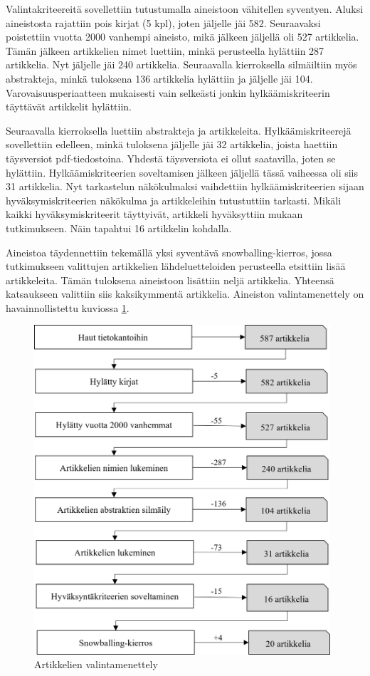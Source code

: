 \documentclass[utf8]{gradu3}
\begin{document}
Valintakriteereitä sovellettiin tutustumalla aineistoon vähitellen syventyen. Aluksi  aineistosta rajattiin pois kirjat (5 kpl), joten jäljelle jäi 582. Seuraavaksi poistettiin vuotta 2000 vanhempi aineisto, mikä jälkeen jäljellä oli 527 artikkelia. Tämän jälkeen artikkelien nimet luettiin, minkä perusteella hylättiin 287 artikkelia. Nyt jäljelle jäi 240 artikkelia. Seuraavalla kierroksella silmäiltiin myös abstrakteja, minkä tuloksena 136 artikkelia hylättiin ja jäljelle jäi 104. Varovaisuusperiaatteen mukaisesti vain selkeästi jonkin hylkäämiskriteerin täyttävät artikkelit hylättiin.

Seuraavalla kierroksella luettiin abstrakteja ja artikkeleita. Hylkäämiskriteerejä sovellettiin edelleen, minkä tuloksena jäljelle jäi 32 artikkelia, joista haettiin täysversiot pdf-tiedostoina. Yhdestä täysversiota ei ollut saatavilla, joten se hylättiin. Hylkäämiskriteerien soveltamisen jälkeen jäljellä tässä vaiheessa oli siis 31 artikkelia. Nyt tarkastelun näkökulmaksi vaihdettiin hylkäämiskriteerien sijaan hyväksymiskriteerien näkökulma ja artikkeleihin tutustuttiin tarkasti. Mikäli kaikki hyväksymiskriteerit täyttyivät, artikkeli hyväksyttiin mukaan tutkimukseen. Näin tapahtui 16 artikkelin kohdalla.

Aineistoa täydennettiin tekemällä yksi syventävä snowballing-kierros, jossa tutkimukseen valittujen artikkelien lähdeluetteloiden perusteella etsittiin lisää artikkeleita. Tämän tuloksena aineistoon lisättiin neljä artikkelia. Yhteensä katsaukseen valittiin siis kaksikymmentä artikkelia. Aineiston valintamenettely on havainnollistettu kuviossa \ref{kuvio:aineiston-rajaaminen-laaja}.

\begin{figure}[h]
    \centering
    \includegraphics[width=11cm]{media/aineiston-rajaaminen-laaja-vaakalinja.png}
    \caption{Artikkelien valintamenettely}
    \label{kuvio:aineiston-rajaaminen-laaja}
\end{figure}
\end{document}
